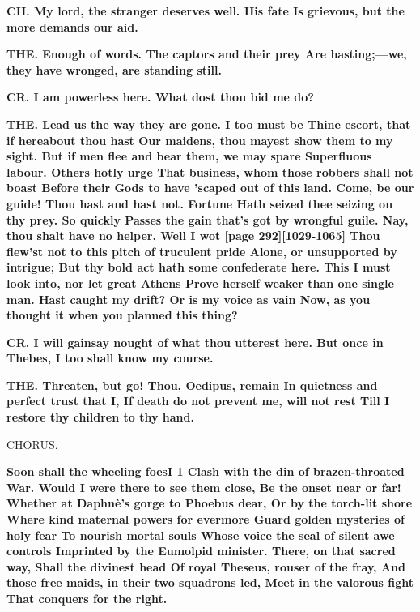 \documentclass[11pt,letter]{book}
\begin{document}
\par \textbf{CH. My lord, the stranger deserves well. His fate Is grievous, but the more demands our aid.}
\par 

\par \textbf{THE. Enough of words. The captors and their prey Are hasting;—we, they have wronged, are standing still.}
\par 

\par \textbf{CR. I am powerless here. What dost thou bid me do?}
\par 

\par \textbf{THE. Lead us the way they are gone. I too must be Thine escort, that if hereabout thou hast Our maidens, thou mayest show them to my sight. But if men flee and bear them, we may spare Superfluous labour. Others hotly urge That business, whom those robbers shall not boast Before their Gods to have ’scaped out of this land. Come, be our guide! Thou hast and hast not. Fortune Hath seized thee seizing on thy prey. So quickly Passes the gain that’s got by wrongful guile. Nay, thou shalt have no helper. Well I wot [page 292][1029-1065] Thou flew’st not to this pitch of truculent pride Alone, or unsupported by intrigue; But thy bold act hath some confederate here. This I must look into, nor let great Athens Prove herself weaker than one single man. Hast caught my drift? Or is my voice as vain Now, as you thought it when you planned this thing?}
\par 

\par \textbf{CR. I will gainsay nought of what thou utterest here. But once in Thebes, I too shall know my course.}
\par 

\par \textbf{THE. Threaten, but go! Thou, Oedipus, remain In quietness and perfect trust that I, If death do not prevent me, will not rest Till I restore thy children to thy hand.}
\par 

\par  CHORUS.

\par \textbf{Soon shall the wheeling foesI 1 Clash with the din of brazen-throated War. Would I were there to see them close, Be the onset near or far! Whether at Daphnè’s gorge to Phoebus dear, Or by the torch-lit shore Where kind maternal powers for evermore Guard golden mysteries of holy fear To nourish mortal souls Whose voice the seal of silent awe controls Imprinted by the Eumolpid minister. There, on that sacred way, Shall the divinest head Of royal Theseus, rouser of the fray, And those free maids, in their two squadrons led, Meet in the valorous fight That conquers for the right.}
\par 
\end{document}
